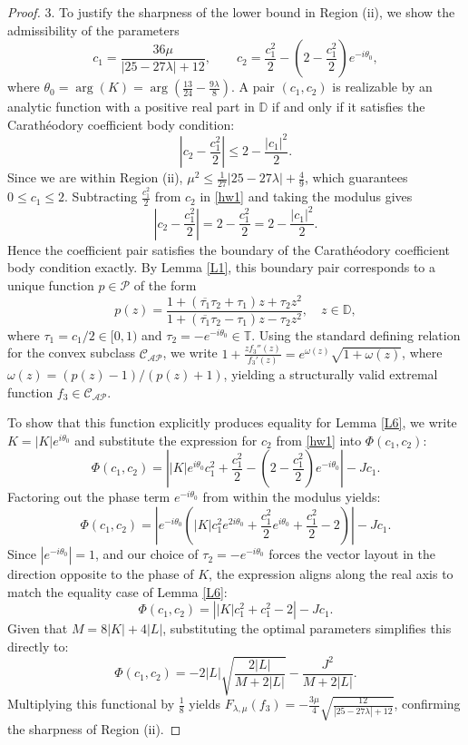 \documentclass[10pt,a4paper]{amsart}
\newcommand{\ol}{\overline}
\numberwithin{equation}{section}
\begin{document}
\begin{proof}
3. To justify the sharpness of the lower bound in Region (ii), we show the admissibility of the parameters
\begin{equation}\label{hw1}
c_1 = \frac{36\mu}{|25-27\lambda|+12}, \qquad c_2 = \frac{c_1^2}{2} - \left(2 - \frac{c_1^2}{2}\right)e^{-i\theta_0},
\end{equation}
where $\theta_0 = \arg(K) = \arg\left(\frac{13}{24} - \frac{9\lambda}{8}\right)$. A pair $(c_1, c_2)$ is realizable by an analytic function with a positive real part in $\mathbb{D}$ if and only if it satisfies the Carath\'{e}odory coefficient body condition:
\begin{equation}\label{hw2}
\left| c_2 - \frac{c_1^2}{2} \right| \le 2 - \frac{|c_1|^2}{2}.
\end{equation}
Since we are within Region (ii), $\mu^2 \le \frac{1}{27} |25 - 27\lambda| + \frac{4}{9}$, which guarantees $0 \le c_1 \le 2$. Subtracting $\frac{c_1^2}{2}$ from $c_2$ in \eqref{hw1} and taking the modulus gives
\[
\left| c_2 - \frac{c_1^2}{2} \right| = 2 - \frac{c_1^2}{2} = 2 - \frac{|c_1|^2}{2}.
\]
Hence the coefficient pair satisfies the boundary of the Carath\'{e}odory coefficient body condition exactly. By Lemma \ref{L1}, this boundary pair corresponds to a unique function $p \in \mathcal{P}$ of the form
\[
p(z) = \frac{1 + (\ol{\tau_1}\tau_2 + \tau_1)z + \tau_2 z^2}{1 + (\ol{\tau_1}\tau_2 - \tau_1)z - \tau_2 z^2}, \quad z\in\mathbb{D},
\]
where $\tau_1 = c_1/2 \in [0,1)$ and $\tau_2 = -e^{-i\theta_0} \in \mathbb{T}$. Using the standard defining relation for the convex subclass $\mathcal{C}_{\mathcal{AP}}$, we write $1 + \frac{z f_3''(z)}{f_3'(z)} = e^{\omega(z)}\sqrt{1+\omega(z)}$, where $\omega(z) = (p(z)-1)/(p(z)+1)$, yielding a structurally valid extremal function $f_3 \in \mathcal{C}_{\mathcal{AP}}$.

To show that this function explicitly produces equality for Lemma \ref{L6}, we write $K = |K|e^{i\theta_0}$ and substitute the expression for $c_2$ from \eqref{hw1} into $\Phi(c_1,c_2)$:
\[
\Phi(c_1,c_2) = \left| |K|e^{i\theta_0}c_1^2 + \frac{c_1^2}{2} - \left(2 - \frac{c_1^2}{2}\right)e^{-i\theta_0} \right| - J c_1.
\]
Factoring out the phase term $e^{-i\theta_0}$ from within the modulus yields:
\[
\Phi(c_1,c_2) = \left| e^{-i\theta_0} \left( |K|c_1^2 e^{2i\theta_0} + \frac{c_1^2}{2}e^{i\theta_0} + \frac{c_1^2}{2} - 2 \right) \right| - J c_1.
\]
Since $|e^{-i\theta_0}| = 1$, and our choice of $\tau_2 = -e^{-i\theta_0}$ forces the vector layout in the direction opposite to the phase of $K$, the expression aligns along the real axis to match the equality case of Lemma \ref{L6}:
\[
\Phi(c_1,c_2) = \left| |K|c_1^2 + c_1^2 - 2 \right| - J c_1.
\]
Given that $M = 8|K| + 4|L|$, substituting the optimal parameters simplifies this directly to:
\[
\Phi(c_1,c_2) = -2|L| \sqrt{\frac{2|L|}{M+2|L|}} - \frac{J^2}{M+2|L|}.
\]
Multiplying this functional by $\frac{1}{8}$ yields $F_{\lambda,\mu}(f_3) = -\frac{3\mu}{4} \sqrt{ \frac{12}{|25 - 27\lambda| + 12} }$, confirming the sharpness of Region (ii).
\end{proof}
\end{document}
